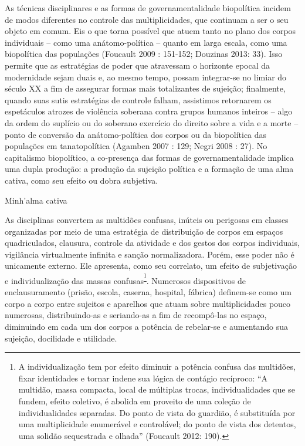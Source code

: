 As técnicas disciplinares e as formas de governamentalidade biopolítica
incidem de modos diferentes no controle das multiplicidades, que
continuam a ser o seu objeto em comum. Eis o que torna possível que
atuem tanto no plano dos corpos individuais -- como uma anátomo-política
-- quanto em larga escala, como uma biopolítica das populações (Foucault
2009 : 151-152; Douzinas 2013: 33). Isso permite que as estratégias de
poder que atravessam o horizonte epocal da modernidade sejam duais e, ao
mesmo tempo, possam integrar-se no limiar do século XX a fim de
assegurar formas mais totalizantes de sujeição; finalmente, quando suas
sutis estratégias de controle falham, assistimos retornarem os
espetáculos atrozes de violência soberana contra grupos humanos inteiros
-- algo da ordem do suplício ou do soberano exercício do direito sobre a
vida e a morte -- ponto de conversão da anátomo-política dos corpos ou
da biopolítica das populações em tanatopolítica (Agamben 2007 : 129;
Negri 2008 : 27). No capitalismo biopolítico, a co-presença das formas
de governamentalidade implica uma dupla produção: a produção da sujeição
política e a formação de uma alma cativa, como seu efeito ou dobra
subjetiva.

Minh'alma cativa

As disciplinas convertem as multidões confusas, inúteis ou perigosas em
classes organizadas por meio de uma estratégia de distribuição de corpos
em espaços quadriculados, clausura, controle da atividade e dos gestos
dos corpos individuais, vigilância virtualmente infinita e sanção
normalizadora. Porém, esse poder não é unicamente externo. Ele
apresenta, como seu correlato, um efeito de subjetivação e
individualização das massas confusas\textsuperscript{\footnote{A
  individualização tem por efeito diminuir a potência confusa das
  multidões, fixar identidades e tornar indene sua lógica de contágio
  recíproco: ``A multidão, massa compacta, local de múltiplas trocas,
  individualidades que se fundem, efeito coletivo, é abolida em proveito
  de uma coleção de individualidades separadas. Do ponto de vista do
  guardião, é substituída por uma multiplicidade enumerável e
  controlável; do ponto de vista dos detentos, uma solidão sequestrada e
  olhada'' (Foucault 2012: 190).}}. Numerosos dispositivos de
enclausuramento (prisão, escola, caserna, hospital, fábrica) definem-se
como um corpo a corpo entre sujeitos e aparelhos que atuam sobre
multiplicidades pouco numerosas, distribuindo-as e seriando-as a fim de
recompô-las no espaço, diminuindo em cada um dos corpos a potência de
rebelar-se e aumentando sua sujeição, docilidade e utilidade.

